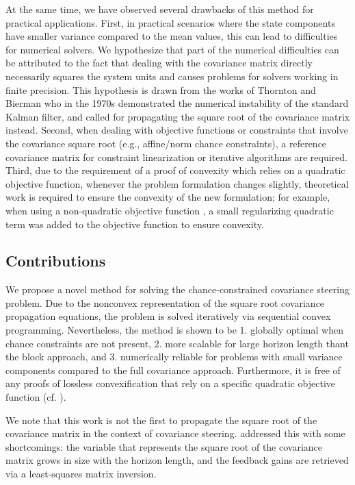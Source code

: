 \documentclass{IEEEtran}
\begin{document}
At the same time, we have observed several drawbacks of this method for practical applications. First, in practical scenarios \cite{oguriChanceConstrainedControlSafe2024a,kumagaiRobustCislunarLowThrust2025a} where the state components have smaller variance compared to the mean values, this can lead to difficulties for numerical solvers. We hypothesize that part of the numerical difficulties can be attributed to the fact that dealing with the covariance matrix directly necessarily squares the system units and causes problems for solvers working in finite precision. This hypothesis is drawn from the works of Thornton and Bierman \cite{thorntonNumericalComparisonDiscrete1976} who in the 1970s demonstrated the numerical instability of the standard Kalman filter, and called for propagating the square root of the covariance matrix instead. 
Second, when dealing with objective functions or constraints that involve the covariance square root (e.g., affine/norm chance constraints), a reference covariance matrix for constraint linearization \cite{rapakouliasDiscreteTimeOptimalCovariance2023} or iterative algorithms \cite{pilipovskyComputationallyEfficientChance2023} are required. Third, due to the requirement of a proof of convexity which relies on a quadratic objective function, whenever the problem formulation changes slightly, theoretical work is required to ensure the convexity of the new formulation; for example, when using a non-quadratic objective function \cite{kumagaiRobustCislunarLowThrust2025a}, a small regularizing quadratic term was added to the objective function to ensure convexity.

\subsection{Contributions}
We propose a novel method for solving the chance-constrained covariance steering problem. Due to the nonconvex representation of the square root covariance propagation equations, the problem is solved iteratively via sequential convex programming. Nevertheless, the method is shown to be 1. globally optimal when chance constraints are not present, 2. more scalable for large horizon length thant the block approach, and 3. numerically reliable for problems with small variance components compared to the full covariance approach. Furthermore, it is free of any proofs of lossless convexification that rely on a specific quadratic objective function (cf. \cite{liuOptimalCovarianceSteering2025}).

We note that this work is not the first to propagate the square root of the covariance matrix in the context of covariance steering. \cite{oguriStochasticSequentialConvex2022} addressed this with some shortcomings: the variable that represents the square root of the covariance matrix grows in size with the horizon length, and the feedback gains are retrieved via a least-squares matrix inversion.
\end{document}
